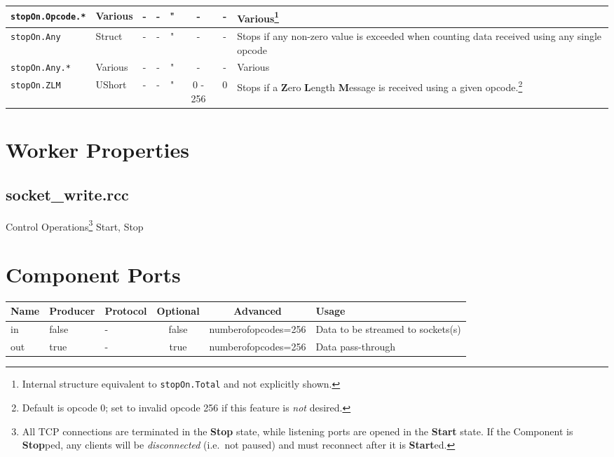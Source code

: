 \documentclass{article}
\def\comp{socket\_write}
\begin{document}
\begin{landscape}
\begin{minipage}{\textwidth}
\begin{scriptsize}
\begin{tabular}{|p{3.2cm}|p{1.5cm}|c|c|c|c|c|p{7cm}|}
      \hline
      \verb+stopOn.Opcode.*+        & Various   & -              & -               & "                  & -           & -             & Various\footnote{\label{stopon}Internal structure equivalent to \texttt{stopOn.Total} and not explicitly shown.} \\
      \hline
      \verb+stopOn.Any+             & Struct    & -              & -               & "                  & -           & -             & Stops if any non-zero value is exceeded when counting data received using any single opcode \\
      \hline
      \verb+stopOn.Any.*+           & Various   & -              & -               & "                  & -           & -             & Various \\
      \hline
      \verb+stopOn.ZLM+             & UShort    & -              & -               & "                  & 0 - 256     & 0             & Stops if a \textbf{Z}ero \textbf{L}ength \textbf{M}essage is received using a given opcode.\footnote{Default is opcode 0; set to invalid opcode 256 if this feature is \textit{not} desired.} \\
      \hline
    \end{tabular}
  \end{scriptsize}
  \end{minipage}
  \section*{Worker Properties}
  \subsection*{\comp.rcc}
  Control Operations\footnote{All TCP connections are terminated in the \textbf{Stop} state, while listening ports are opened in the \textbf{Start} state. If the Component is \textbf{Stop}ped, any clients will be \emph{disconnected} (i.e.\ not paused) and must reconnect after it is \textbf{Start}ed.} Start, Stop

  \section*{Component Ports}
  \begin{scriptsize}
    \begin{tabular}{|M{2cm}|M{1.5cm}|M{4cm}|c|c|M{9cm}|}
      \hline
      Name & Producer & Protocol & Optional & Advanced            & Usage \\
      \hline
      in   & false    & -        & false    & numberofopcodes=256 & Data to be streamed to sockets(s) \\
      \hline
      out  & true     & -        & true     & numberofopcodes=256 & Data pass-through \\
      \hline
    \end{tabular}
  \end{scriptsize}


\end{landscape}
\end{document}
